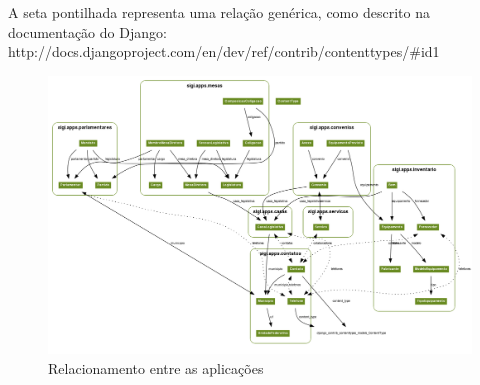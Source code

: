 A seta pontilhada representa uma relação genérica, como descrito na
documentação do Django:\\
http://docs.djangoproject.com/en/dev/ref/contrib/contenttypes/\#id1

\begin{figure}[p]
  \centering
  \includegraphics[angle=90,width=130mm]{../imagens/apps.png}
  \caption{Relacionamento entre as aplicações}
  \label{fig:apps}
\end{figure}


%
%

